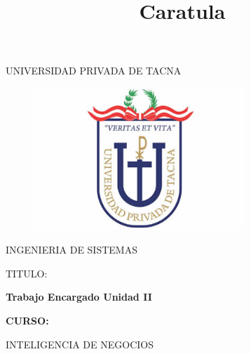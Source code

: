 \documentclass[12pt,letterpaper]{article}
\begin{document}
%


\title{Caratula}

\begin{titlepage}
\begin{center}
\large{UNIVERSIDAD PRIVADA DE TACNA}\\
\vspace*{-0.025in}
\begin{figure}[htb]
\begin{center}
\includegraphics[width=8cm]{imagenes/logo.jpg}
\end{center}
\end{figure}
\vspace*{0.15in}
INGENIERIA DE SISTEMAS  \\

\vspace*{0.5in}
\begin{large}
TITULO:\\
\end{large}

\vspace*{0.1in}
\begin{Large}
\textbf{Trabajo Encargado Unidad II} \\
\end{Large}

\vspace*{0.3in}
\begin{Large}
\textbf{CURSO:} \\
\end{Large}

\vspace*{0.1in}
\begin{large}
INTELIGENCIA DE NEGOCIOS\\
\end{large}


\end{center}
\end{titlepage}
\end{document}
